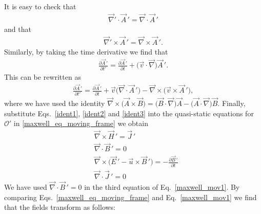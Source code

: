 \documentclass[12pt,a4paper,oneside]{book}
\begin{document}
\begin{onehalfspace}
It is easy to check that
\begin{equation}\label{ident1}
	\begin{aligned}
		\vec{\nabla}'\cdot\vec{A}\,' = \vec{\nabla}\cdot\vec{A}\,'
	\end{aligned}
\end{equation} 
and that
\begin{equation}\label{ident2}
	\begin{aligned}
		\vec{\nabla}'\times\vec{A}\,' = \vec{\nabla}\times\vec{A}\,'.
	\end{aligned}
\end{equation} 
Similarly, by taking the time derivative we find that
\begin{equation}
	\begin{aligned}
		\frac{\partial \vec{A}\,'}{\partial t'} = \frac{\partial \vec{A}\,'}{\partial t} + \big(\vec{v}\cdot\vec{\nabla}\big)\vec{A}\,'.
	\end{aligned}
\end{equation} 
This can be rewritten as
  \begin{equation}\label{ident3}
  	\begin{aligned}
  		\frac{\partial \vec{A}\,'}{\partial t'} = \frac{\partial \vec{A}\,'}{\partial t} + \vec{v}\big(\vec{\nabla}\cdot\vec{A}\,'\big)-\vec{\nabla}\times\big(\vec{v}\times\vec{A}\,'\big),
  	\end{aligned}
  \end{equation} 
where we have used the identity $\vec{\nabla}\times\big(\vec{A}\times\vec{B}\big)=\big(\vec{B}\cdot\vec{\nabla}\big)\vec{A}-\big(\vec{A}\cdot\vec{\nabla}\big)\vec{B}$. Finally, substitute Eqs.~\eqref{ident1}, \ref{ident2} and \ref{ident3} into the quasi-static equations for $\mathcal{O}'$ in \ref{maxwell_eq_moving_frame} we obtain 
\begin{equation}\label{maxwell_mov1}
	\begin{aligned}
		&\vec{\nabla}\times\vec{H}\,'=\vec{J}\,' \\[8pt]
		&\vec{\nabla}\cdot\vec{B}\,'= 0 \\[8pt]
		&\vec{\nabla}\times\big(\vec{E}\,'-\vec{u}\times\vec{B}\,'\big)=-\frac{\partial\vec{B}\,'}{\partial t} \\[8pt]
		&\vec{\nabla}\cdot\vec{J}\,'=0
	\end{aligned}
\end{equation} 
We have used $\vec{\nabla}\cdot\vec{B}\,'=0$ in the third equation of Eq.~\eqref{maxwell_mov1}. By comparing Eqs.~\eqref{maxwell_eq_moving_frame} and Eq.~\eqref{maxwell_mov1} we find that the fields transform as follows:

\end{onehalfspace}
\end{document}
